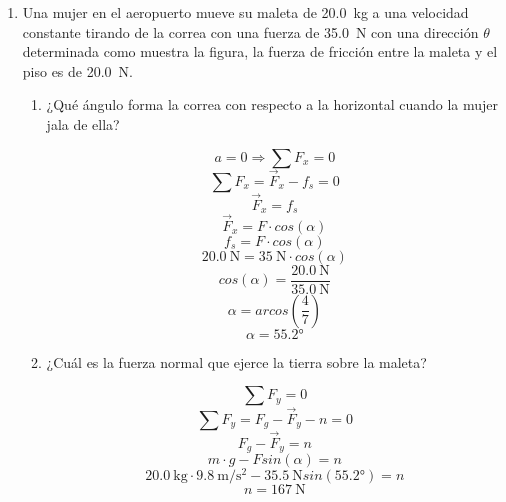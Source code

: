 \documentclass[Física - Práctica.root.tex]{subfiles}
\newcommand{\gravity}[1][per-mode=fraction]{\SI[#1]{9,8}{\meter\per\second\squared}}
\begin{document}
\begin{enumerate}
  \item
        \begin{multicols}{2}
          Una mujer en el aeropuerto mueve su maleta de \SI{20,0}{\kilogram} a una
          velocidad constante tirando de la correa con una fuerza de \SI{35,0}{\newton} con
          una dirección $\theta$ determinada como muestra la figura, la fuerza de
          fricción entre la maleta y el piso es de \SI{20,0}{\newton}.
          \begin{center}
          \end{center}
        \end{multicols}
        \begin{enumerate}
          \item ¿Qué ángulo forma la correa con respecto a la horizontal cuando la mujer jala de ella?
                \begin{center}
                  \[ a = 0 \Rightarrow \sum F_x = 0 \]
                  \[ \sum F_x = \vec{F}_x - f_s = 0 \]
                  \[ \vec{F}_x = f_s \]
                  \[ \vec{F}_x = F\cdot cos(\alpha) \]
                  \[ f_s = F\cdot cos(\alpha) \]
                  \[ \SI{20,0}{\newton} = \SI{35}{\newton}\cdot cos(\alpha)\]
                  \[ cos(\alpha) = \frac{\SI{20,0}{\newton}}{\SI{35,0}{\newton}} \]
                  \[ \alpha = arcos(\frac{4}{7}) \]
                  \[ \boxed{\alpha = \ang{55,2}} \]
                \end{center}
          \item ¿Cuál es la fuerza normal que ejerce la tierra sobre la maleta?
                \begin{center}
                  \[ \sum F_y = 0 \]
                  \[ \sum F_y = F_g - \vec{F}_y - n = 0 \]
                  \[ F_g - \vec{F}_y = n \]
                  \[ m\cdot g - Fsin(\alpha) = n \]
                  \[ \SI{20,0}{\kilogram}\cdot \gravity - \SI{35,5}{\newton}sin(\ang{55,2}) = n \]
                  \[ \boxed{n = \SI{167}{\newton}} \]
                \end{center}
        \end{enumerate}


\end{enumerate}
\end{document}
